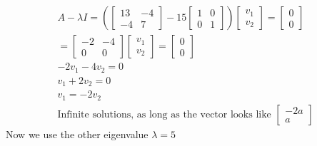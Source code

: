 \begin{align}
  A - \lambda I = 
(  \begin{bmatrix}
     13 & -4 \\
     -4 & 7
  \end{bmatrix}
  - 15
  \begin{bmatrix}
    1 & 0 \\
    0 & 1
  \end{bmatrix})
  \begin{bmatrix}
    v_1 \\
    v_2
  \end{bmatrix}
  =
  \begin{bmatrix}
    0 \\ 
    0
  \end{bmatrix}
  \\ 
  =
  \begin{bmatrix}
    -2 & -4 \\
    0 & 0
  \end{bmatrix}
  \begin{bmatrix}
    v_1 \\
    v_2
  \end{bmatrix}
  =
  \begin{bmatrix}
    0 \\ 
    0
  \end{bmatrix} \\
  -2 v_1 - 4v_2 = 0 \\
  v_1 + 2v_2 = 0 \\
  v_1 = - 2 v_2 \\
  \text{Infinite solutions, as long as the vector looks like }
  \begin{bmatrix}
    -2 a \\
    a
  \end{bmatrix}
\end{align}
Now we use the other eigenvalue $\lambda = 5$

